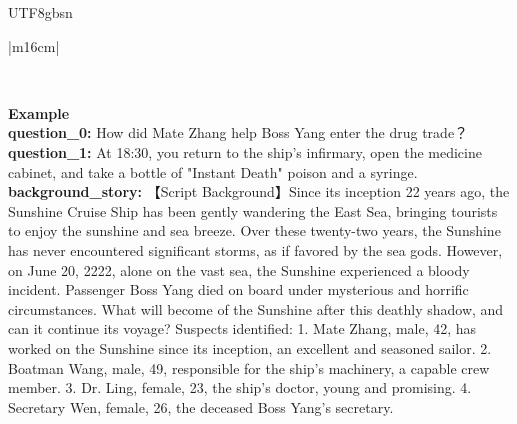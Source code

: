 \documentclass[11pt]{article}
\begin{document}
{\begin{CJK}{UTF8}{gbsn}
\begin{table}[ht!]
\begin{minipage}[t]{\linewidth}
\begin{tabular}{|m{16cm}|}
\begin{minipage}[t]{\linewidth}
\begin{verbatim}
\end{verbatim}
\end{minipage} \\
\hline
{}  \textbf{Example}  \\
 \textbf{  question\_0:} \small How did Mate Zhang help Boss Yang enter the drug trade？\\
  \textbf{  question\_1:} \small At 18:30, you return to the ship's infirmary, open the medicine cabinet, and take a bottle of "Instant Death" poison and a syringe.  \\
  \textbf{  background\_story:} \small【Script Background】Since its inception 22 years ago, the Sunshine Cruise Ship has been gently wandering the East Sea, bringing tourists to enjoy the sunshine and sea breeze. Over these twenty-two years, the Sunshine has never encountered significant storms, as if favored by the sea gods. However, on June 20, 2222, alone on the vast sea, the Sunshine experienced a bloody incident. Passenger Boss Yang died on board under mysterious and horrific circumstances. What will become of the Sunshine after this deathly shadow, and can it continue its voyage? Suspects identified: 1. Mate Zhang, male, 42, has worked on the Sunshine since its inception, an excellent and seasoned sailor. 2. Boatman Wang, male, 49, responsible for the ship's machinery, a capable crew member. 3. Dr. Ling, female, 23, the ship's doctor, young and promising. 4. Secretary Wen, female, 26, the deceased Boss Yang's secretary.  \\


\end{tabular}
\end{minipage}
\end{table}
\end{CJK}}
\end{document}
